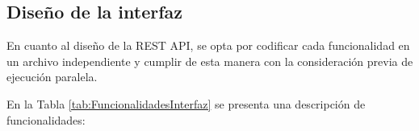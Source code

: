         
        
        \subsection{Diseño de la interfaz}
            \par En cuanto al diseño de la REST API, se opta por codificar cada funcionalidad en un archivo independiente y cumplir de esta manera con la consideración previa de ejecución paralela.
            \par En la Tabla \ref{tab:FuncionalidadesInterfaz} se presenta una descripción de funcionalidades:
            
            
            
